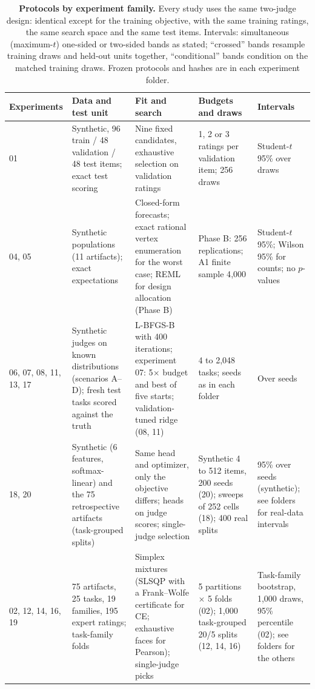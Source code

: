 \begin{table}[t]
\caption{\textbf{Protocols by experiment family.}
Every study uses the same two-judge design: identical except for the training objective, with the same training ratings, the same search space and the same test items.
Intervals: simultaneous (maximum-$t$) one-sided or two-sided bands as stated; ``crossed'' bands resample training draws and held-out units together, ``conditional'' bands condition on the matched training draws.
Frozen protocols and hashes are in each experiment folder.}
\label{tab:protocols}
\centering\scriptsize
\setlength{\tabcolsep}{3pt}
\begin{tabular}{@{}p{}p{}p{}p{}p{}@{}}
\toprule
Experiments & Data and test unit & Fit and search & Budgets and draws & Intervals \\
\midrule
01 & Synthetic, 96 train / 48 validation / 48 test items; exact test scoring & Nine fixed candidates, exhaustive selection on validation ratings & 1, 2 or 3 ratings per validation item; 256 draws & Student-$t$ 95\% over draws \\
04, 05 & Synthetic populations (11 artifacts); exact expectations & Closed-form forecasts; exact rational vertex enumeration for the worst case; REML for design allocation (Phase B) & Phase B: 256 replications; A1 finite sample 4{,}000 & Student-$t$ 95\%; Wilson 95\% for counts; no $p$-values \\
06, 07, 08, 11, 13, 17 & Synthetic judges on known distributions (scenarios A--D); fresh test tasks scored against the truth & L-BFGS-B with 400 iterations; experiment 07: 5$\times$ budget and best of five starts; validation-tuned ridge (08, 11) & 4 to 2{,}048 tasks; seeds as in each folder & Over seeds \\
18, 20 & Synthetic (6 features, softmax-linear) and the 75 retrospective artifacts (task-grouped splits) & Same head and optimizer, only the objective differs; heads on judge scores; single-judge selection & Synthetic 4 to 512 items, 200 seeds (20); sweeps of 252 cells (18); 400 real splits & 95\% over seeds (synthetic); see folders for real-data intervals \\
02, 12, 14, 16, 19 & 75 artifacts, 25 tasks, 19 families, 195 expert ratings; task-family folds & Simplex mixtures (SLSQP with a Frank--Wolfe certificate for CE; exhaustive faces for Pearson); single-judge picks & 5 partitions $\times$ 5 folds (02); 1{,}000 task-grouped 20/5 splits (12, 14, 16) & Task-family bootstrap, 1{,}000 draws, 95\% percentile (02); see folders for the others \\

\end{tabular}
\end{table}
